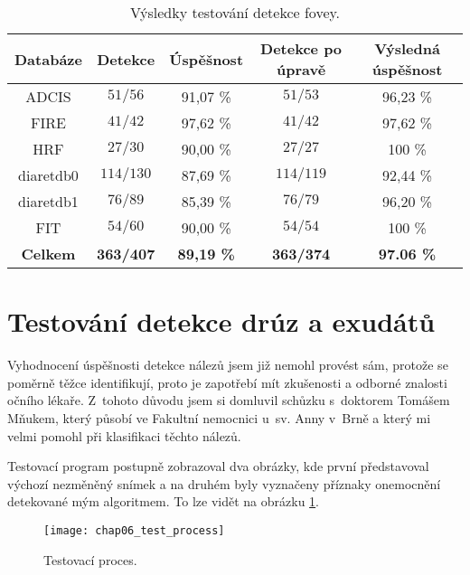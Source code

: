 \begin{table}[ht]
  \begin{center}	
    \begin{tabular}{|c|c|c|c|c|}
      \hline
      \textbf{Databáze} & \textbf{Detekce} & \textbf{Úspěšnost} & \textbf{Detekce po úpravě} & \textbf{Výsledná úspěšnost}\\
      \hline
      ADCIS     & $51/56$   & 91,07 \% & $51/53$   & 96,23 \%\\
      \hline
      FIRE      & $41/42$   & 97,62 \% & $41/42$   & 97,62 \%\\
      \hline
      HRF       & $27/30$   & 90,00 \% & $27/27$   & 100 \%\\
      \hline
      diaretdb0 & $114/130$ & 87,69 \% & $114/119$ & 92,44 \%\\
      \hline
      diaretdb1 & $76/89$   & 85,39 \% & $76/79$   & 96,20 \%\\
      \hline
      FIT       & $54/60$   & 90,00 \% & $54/54$   & 100 \%\\
      \hline
      \hline
      \textbf{Celkem} & \textbf{363/407} & \textbf{89,19 \%} & \textbf{363/374} & \textbf{97.06 \%} \\
      \hline
    \end{tabular}
  \caption{Výsledky testování detekce fovey.}
  \label{tab:results_fovea}
  \end{center}
\end{table}


\section{Testování detekce drúz a exudátů}
Vyhodnocení úspěšnosti detekce nálezů jsem již nemohl provést sám, protože se poměrně těžce identifikují, proto je zapotřebí mít zkušenosti a odborné znalosti očního lékaře. Z~tohoto důvodu jsem si domluvil schůzku s~doktorem Tomášem Mňukem, který působí ve Fakultní nemocnici u~sv. Anny v~Brně a který mi velmi pomohl při klasifikaci těchto nálezů.

Testovací program postupně zobrazoval dva obrázky, kde první představoval výchozí nezměněný snímek a na druhém byly vyznačeny příznaky onemocnění detekované mým algoritmem. To lze vidět na obrázku \ref{pic:chap06_test_process}.

\begin{figure}[h]
  \begin{center}
    \texttt{[image: chap06\_test\_process]}
    \caption{Testovací proces.}
    \label{pic:chap06_test_process}
  \end{center}
\end{figure}

